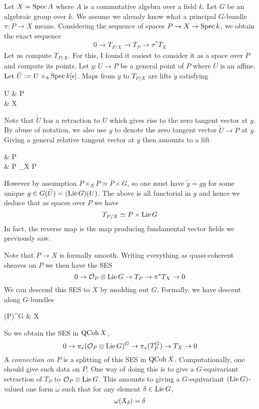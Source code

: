 \documentclass[./main.tex]{subfiles}
\begin{document}
Let $X = \operatorname{Spec} A$ where $A$ is a commutative algebra over a field $k$.
Let $G$ be an algebraic group over $k$.
We assume we already know what a principal $G$-bundle $\pi : P \to X$ means.
Considering the sequence of spaces $P \to X \to \operatorname{Spec} k$, 
we obtain the exact sequence
\[
  0 \to T_{P / X} \to T_{P} \to \pi^* T_X
\]
Let us compute $T_{P / X}$.
For this, I found it easiest to consider it as a space over $P$
and compute its points.
Let $y : U \to P$ be a general point of $P$ where $U$ is an affine.
Let $\tilde{U} := U \times_k \operatorname{Spec} k[\epsilon]$.
Maps from $y$ to $T_{P / X}$ are lifts $\tilde{y}$ satisfying 
\begin{cd}
  U & P \\
	{} & X
	\arrow["y", from=1-1, to=1-2]
	\arrow["{x = \pi(y)}"', from=2-1, to=2-2]
	\arrow["\subseteq"', from=1-1, to=2-1]
	\arrow["\pi", from=1-2, to=2-2]
	\arrow["{\tilde{y}}"{description}, dashed, from=2-1, to=1-2]
\end{cd}
Note that $\tilde{U}$ has a retraction to $U$
which gives rise to the zero tangent vector at $y$.
By abuse of notation, we also use $y$ to denote the zero tangent vector
$\tilde{U} \to P$ at $y$.
Giving a general relative tangent vector at $y$ then amounts to
a lift 
\begin{cd}
  & P \\
	{} & {P \times_X P}
	\arrow["{(y , \tilde{y})}"', dashed, from=2-1, to=2-2]
	\arrow["y", from=2-1, to=1-2]
	\arrow["{\mathrm{fst}}"', from=2-2, to=1-2]
\end{cd}
However by assumption $P \times_X P \simeq P \times G$,
so one must have $\tilde{y} = g y$ for some unique $g \in G(\tilde{U})
= (\operatorname{Lie} G)(U)$.
The above is all functorial in $y$ and hence we deduce 
that as spaces over $P$ we have
\[
  T_{P / X} \simeq P \times \operatorname{Lie} G
\]
In fact, the reverse map is the map producing
fundamental vector fields we previously saw.

Note that $P \to X$ is formally smooth.
Writing everything as quasi-coherent sheaves on $P$ we then have the SES
\[
  0 \to \mathcal{O}_P \otimes \operatorname{Lie} G \to T_P \to \pi^* T_X \to 0
\]
We can descend this SES to $X$ by modding out $G$.
Formally, we have descent along $G$-bundles
\begin{cd}
  {(\QCOH P)^G } & {\QCOH X}
	\arrow["{\pi^*}"', shift right=2, from=1-2, to=1-1]
	\arrow["{\pi_*(\_^G)}"', shift right=2, from=1-1, to=1-2]
	\arrow["\sim"{description}, draw=none, from=1-1, to=1-2]
\end{cd}
So we obtain the SES in $\operatorname{QCoh} X$,
\[
  0 \to \pi_* (\mathcal{O}_P \otimes \operatorname{Lie} G)^G \to \pi_*(T_P^G) \to T_X \to 0
\]
A \emph{connection on $P$} is a splitting of this SES in $\operatorname{QCoh} X$.
Computationally, one should give such data on $P$.
One way of doing this is to give a $G$-equivariant retraction
of $T_P$ to $\mathcal{O}_P \otimes \operatorname{Lie} G$.
This amounts to giving a $G$-equivariant $(\operatorname{Lie} G)$-valued one form $\omega$ 
such that for any element $\delta \in \operatorname{Lie} G$,
\[
  \omega(X_\delta) = \delta
\]
\cite[Section 19.1]{Mic}
\end{document}
